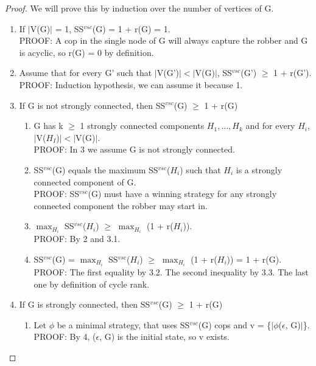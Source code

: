 \begin{proof}
We will prove this by induction over the number of vertices of G.
\begin{enumerate}
  \item If $|$V(G)$|$ = 1, SS$^{vsc}$(G) = 1 + r(G) = 1. \\
  PROOF: A cop in the single node of G will always capture the robber and G is acyclic, so r(G) = 0 by definition.
  \item Assume that for every G' such that  $|$V(G')$| < |$V(G)$|$, SS$^{vsc}$(G') $\geq$ 1 + r(G'). \\
  PROOF: Induction hypothesis, we can assume it because 1.
  \item If G is not strongly connected, then SS$^{vsc}$(G) $\geq$ 1 + r(G)
  \begin{enumerate}[label*=\arabic*.]
    \item G has k $\geq$ 1 strongly connected components $H_1, \ldots, H_k$ and for every $H_i$, $|$V($H_I$)$| < |$V(G)$|$. \\
    PROOF: In 3 we assume G is not strongly connected.
    
    \item SS$^{vsc}$(G) equals the maximum SS$^{vsc}$($H_i$) such that $H_i$ is a strongly connected component of G. \\
    PROOF: SS$^{vsc}$(G) must have a winning strategy for any strongly connected component the robber may start in.
    
    \item $\max_{H_i}$ SS$^{vsc}$($H_i$) $\geq$  $\max_{H_i}$ (1 + r($H_i$)). \\
    PROOF: By 2 and 3.1.
    
    \item SS$^{vsc}$(G) = $\max_{H_i}$ SS$^{vsc}$($H_i$) $\geq$  $\max_{H_i}$ (1 + r($H_i$)) = 1 + r(G). \\
    PROOF: The first equality by 3.2. The second inequality by 3.3. The last one by definition of cycle rank.
  \end{enumerate}
  \item If G is strongly connected, then SS$^{vsc}$(G) $\geq$ 1 + r(G) 
  \begin{enumerate}[label*=\arabic*.]
    \item Let $\phi$ be a minimal strategy, that uses SS$^{vsc}$(G) cops and v = \{$|\phi$($\epsilon$, G)$|$\}. \\
    PROOF: By 4, ($\epsilon$, G) is the initial state, so v exists.
    

\end{enumerate}
\end{enumerate}
\end{proof}
